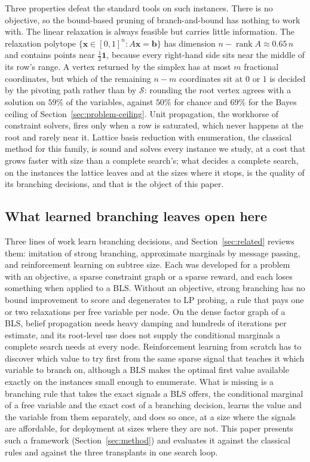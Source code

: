 \documentclass[final,5p,times,twocolumn,authoryear]{elsarticle}
\newcommand{\SOL}{\mathcal{S}}
\begin{document}
Three properties defeat the standard tools on such instances. There is no objective, so the bound-based pruning of branch-and-bound has nothing to work with. The linear relaxation is always feasible but carries little information. The relaxation polytope $\{\mathbf{x}\in[0,1]^n: A\mathbf{x}=\mathbf{b}\}$ has dimension $n-\operatorname{rank}A\approx0.65\,n$ and contains points near $\tfrac12\mathbf{1}$, because every right-hand side sits near the middle of its row's range. A vertex returned by the simplex has at most $m$ fractional coordinates, but which of the remaining $n-m$ coordinates sit at $0$ or $1$ is decided by the pivoting path rather than by $\SOL$: rounding the root vertex agrees with a solution on $59\%$ of the variables, against $50\%$ for chance and $69\%$ for the Bayes ceiling of Section~\ref{sec:problem-ceiling}. Unit propagation, the workhorse of constraint solvers, fires only when a row is saturated, which never happens at the root and rarely near it. Lattice basis reduction with enumeration, the classical method for this family, is sound and solves every instance we study, at a cost that grows faster with size than a complete search's; what decides a complete search, on the instances the lattice leaves and at the sizes where it stops, is the quality of its branching decisions, and that is the object of this paper.

\subsection{What learned branching leaves open here}
Three lines of work learn branching decisions, and Section~\ref{sec:related} reviews them: imitation of strong branching, approximate marginals by message passing, and reinforcement learning on subtree size. Each was developed for a problem with an objective, a sparse constraint graph or a sparse reward, and each loses something when applied to a BLS. Without an objective, strong branching has no bound improvement to score and degenerates to LP probing, a rule that pays one or two relaxations per free variable per node. On the dense factor graph of a BLS, belief propagation needs heavy damping and hundreds of iterations per estimate, and its root-level use does not supply the conditional marginals a complete search needs at every node. Reinforcement learning from scratch has to discover which value to try first from the same sparse signal that teaches it which variable to branch on, although a BLS makes the optimal first value available exactly on the instances small enough to enumerate. What is missing is a branching rule that takes the exact signals a BLS offers, the conditional marginal of a free variable and the exact cost of a branching decision, learns the value and the variable from them separately, and does so once, at a size where the signals are affordable, for deployment at sizes where they are not. This paper presents such a framework (Section~\ref{sec:method}) and evaluates it against the classical rules and against the three transplants in one search loop.
\end{document}
